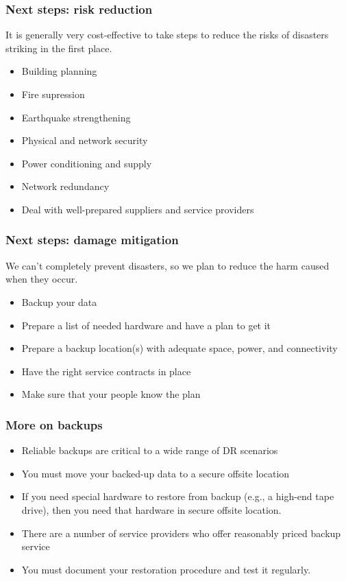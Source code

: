 \documentclass[10pt]{beamer}
\begin{document}
\begin{frame}
  \frametitle{Next steps: risk reduction}

 It is generally very cost-effective to take steps to reduce the risks of disasters
 striking in the first place.

 \begin{itemize}
  \item Building planning
  \item Fire supression
  \item Earthquake strengthening
  \item Physical and network security
  \item Power conditioning and supply
  \item Network redundancy
  \item Deal with well-prepared suppliers and service providers
 \end{itemize}
\end{frame}



\begin{frame}
  \frametitle{Next steps: damage mitigation}

 We can't completely prevent disasters, so we plan to reduce the harm
 caused when they occur.
 
 \begin{itemize}
  \item Backup your data
  \item Prepare a list of needed hardware and have a plan to get it
  \item Prepare a backup location(s) with adequate space, power, and connectivity
  \item Have the right service contracts in place
  \item Make sure that your people know the plan
 \end{itemize}
\end{frame}



\begin{frame}
  \frametitle{More on backups}


 \begin{itemize}
  \item Reliable backups are critical to a wide range of DR scenarios
  \item You must move your backed-up data to a secure offsite location
  \item If you need special hardware to restore from backup (e.g., a high-end 
	  tape drive), then you need that hardware in secure offsite location.
  \item There are a number of service providers who offer reasonably priced 
	  backup service
  \item You must document your restoration procedure and test it regularly.
 \end{itemize}
\end{frame}
\end{document}
